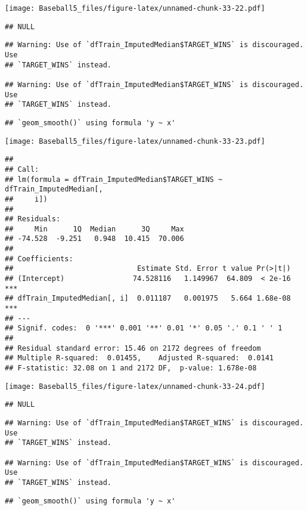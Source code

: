 \documentclass[
]{article}
\begin{document}
\texttt{[image: Baseball5\_files/figure-latex/unnamed-chunk-33-22.pdf]}

\begin{verbatim}
## NULL
\end{verbatim}

\begin{verbatim}
## Warning: Use of `dfTrain_ImputedMedian$TARGET_WINS` is discouraged. Use
## `TARGET_WINS` instead.

## Warning: Use of `dfTrain_ImputedMedian$TARGET_WINS` is discouraged. Use
## `TARGET_WINS` instead.
\end{verbatim}

\begin{verbatim}
## `geom_smooth()` using formula 'y ~ x'
\end{verbatim}

\texttt{[image: Baseball5\_files/figure-latex/unnamed-chunk-33-23.pdf]}

\begin{verbatim}
## 
## Call:
## lm(formula = dfTrain_ImputedMedian$TARGET_WINS ~ dfTrain_ImputedMedian[, 
##     i])
## 
## Residuals:
##     Min      1Q  Median      3Q     Max 
## -74.528  -9.251   0.948  10.415  70.006 
## 
## Coefficients:
##                             Estimate Std. Error t value Pr(>|t|)    
## (Intercept)                74.528116   1.149967  64.809  < 2e-16 ***
## dfTrain_ImputedMedian[, i]  0.011187   0.001975   5.664 1.68e-08 ***
## ---
## Signif. codes:  0 '***' 0.001 '**' 0.01 '*' 0.05 '.' 0.1 ' ' 1
## 
## Residual standard error: 15.46 on 2172 degrees of freedom
## Multiple R-squared:  0.01455,    Adjusted R-squared:  0.0141 
## F-statistic: 32.08 on 1 and 2172 DF,  p-value: 1.678e-08
\end{verbatim}

\texttt{[image: Baseball5\_files/figure-latex/unnamed-chunk-33-24.pdf]}

\begin{verbatim}
## NULL
\end{verbatim}

\begin{verbatim}
## Warning: Use of `dfTrain_ImputedMedian$TARGET_WINS` is discouraged. Use
## `TARGET_WINS` instead.

## Warning: Use of `dfTrain_ImputedMedian$TARGET_WINS` is discouraged. Use
## `TARGET_WINS` instead.
\end{verbatim}

\begin{verbatim}
## `geom_smooth()` using formula 'y ~ x'
\end{verbatim}
\end{document}
